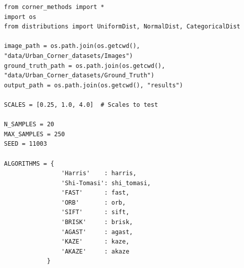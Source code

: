 \documentclass[journal]{IEEEtran}
\begin{document}
\begin{lstlisting}[style=python, caption={Setup Parameters}, label={lst:params}]
from corner_methods import *
import os
from distributions import UniformDist, NormalDist, CategoricalDist

image_path = os.path.join(os.getcwd(), "data/Urban_Corner_datasets/Images")
ground_truth_path = os.path.join(os.getcwd(), "data/Urban_Corner_datasets/Ground_Truth")
output_path = os.path.join(os.getcwd(), "results")

SCALES = [0.25, 1.0, 4.0]  # Scales to test

N_SAMPLES = 20
MAX_SAMPLES = 250
SEED = 11003

ALGORITHMS = {
                'Harris'    : harris,
                'Shi-Tomasi': shi_tomasi,
                'FAST'      : fast,
                'ORB'       : orb,
                'SIFT'      : sift,
                'BRISK'     : brisk,
                'AGAST'     : agast,
                'KAZE'      : kaze,
                'AKAZE'     : akaze
            }


\end{lstlisting}
\end{document}
